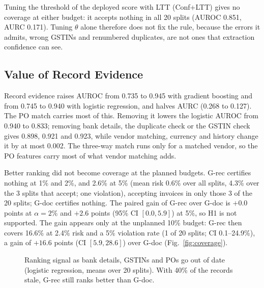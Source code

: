 \documentclass[conference]{IEEEtran}
\newcommand{\sysBl}{\textsf{Conf+LTT}}     %
\newcommand{\sysBone}{\textsf{G-doc}}      %
\newcommand{\sysP}{\textsf{G-rec}}         %
\begin{document}
Tuning the threshold of the deployed score with LTT (\sysBl) gives
no coverage at either budget: it accepts nothing in all 20 splits (AUROC 0.851, AURC
0.171). Tuning $\theta$ alone therefore does not fix the rule, because the errors it
admits, wrong GSTINs and renumbered duplicates, are not ones that extraction
confidence can see.

\subsection{Value of Record Evidence}\label{sec:rq2}
Record evidence raises AUROC from 0.735 to 0.945 with gradient boosting and from
0.745 to 0.940 with logistic regression, and halves AURC (0.268 to 0.127). The
PO match carries most of this. Removing it lowers
the logistic AUROC from 0.940 to 0.833; removing bank details, the duplicate
check or the GSTIN check gives 0.898, 0.921 and 0.923, while vendor matching,
currency and history change it by at most 0.002. The three-way match runs only
for a matched vendor, so the PO features carry most of what vendor matching adds.

Better ranking did not become coverage at the planned budgets. \sysP{}
certifies nothing at 1\% and 2\%, and 2.6\% at 5\% (mean risk 0.6\% over all splits, 4.3\% over the
3 splits that accept; one violation),
accepting invoices in only those 3 of the 20 splits; \sysBone{} certifies
nothing. The paired gain of \sysP{} over \sysBone{} is $+0.0$ points at
$\alpha=2\%$ and $+2.6$ points (95\% CI $[0.0,5.9]$) at 5\%, so H1 is not
supported. The gain appears only at the unplanned 10\% budget: \sysP{} then covers 16.6\% at 2.4\% risk and a 5\% violation rate (1 of
20 splits; CI 0.1--24.9\%), a gain of $+16.6$ points (CI $[5.9,28.6]$) over
\sysBone{} (Fig.~\ref{fig:coverage}).

\begin{figure}[t]
\centering
{}
\caption{Ranking signal as bank details, GSTINs and POs go out of date
(logistic regression, means over 20 splits). With 40\% of the records stale,
\sysP{} still ranks better than \sysBone.}
\label{fig:stale}
\end{figure}
\end{document}
